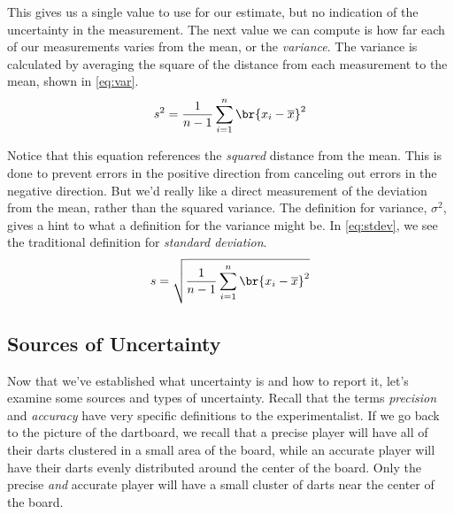 \documentclass[nobib,nofonts,nols,nohyper]{tufte-handout}
\begin{document}
This gives us a single value to use for our estimate, but no indication of the uncertainty in the measurement. 
The next value we can compute is how far each of our measurements varies from the mean, or the \emph{variance}. 
The variance is calculated by averaging the square of the distance from each measurement to the mean, shown in \cref{eq:var}. 
\begin{equation}
	s^2 = \frac{1}{n-1}\sum_{i=1}^{n}{\br{x_i - \overline{x}}^2}
	\label{eq:var}
\end{equation}

Notice that this equation references the \emph{squared} distance from the mean. 
This is done to prevent errors in the positive direction from canceling out errors in the negative direction.
But we'd really like a direct measurement of the deviation from the mean, rather than the squared variance. 
The definition for variance, \( \sigma^2 \), gives a hint to what a definition for the variance might be. 
In \cref{eq:stdev}, we see the traditional definition for \emph{standard deviation}. 
\begin{equation}
	s = \sqrt{\frac{1}{n-1}\sum_{i=1}^{n}{\br{x_i - \overline{x}}^2}}
	\label{eq:stdev}
\end{equation}


\subsection{Sources of Uncertainty} %
\label{sub:sources_of_uncertainty}

Now that we've established what uncertainty is and how to report it, let's examine some sources and types of uncertainty. 
Recall that the terms \emph{precision} and \emph{accuracy} have very specific definitions to the experimentalist. 
If we go back to the picture of the dartboard, we recall that a precise player will have all of their darts clustered in a small area of the board, while an accurate player will have their darts evenly distributed around the center of the board. 
Only the precise \emph{and} accurate player will have a small cluster of darts near the center of the board. 
\end{document}

